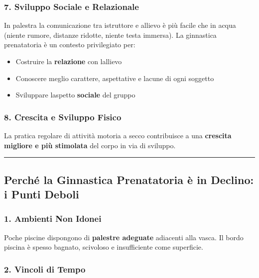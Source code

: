 \documentclass[a4paper,11pt]{article}
\providecommand{\tightlist}{%
  \setlength{\itemsep}{0pt}\setlength{\parskip}{0pt}}
\begin{document}
\subsubsection{7. Sviluppo Sociale e
      Relazionale}\label{sviluppo-sociale-e-relazionale}

In palestra la comunicazione tra istruttore e allievo è più facile che
in acqua (niente rumore, distanze ridotte, niente testa immersa). La
ginnastica prenatatoria è un contesto privilegiato per:

\begin{itemize}
      \tightlist
      \item
            Costruire la \textbf{relazione} con l\textquotesingle allievo
      \item
            Conoscere meglio carattere, aspettative e lacune di ogni soggetto
      \item
            Sviluppare l\textquotesingle aspetto \textbf{sociale} del gruppo
\end{itemize}

\subsubsection{8. Crescita e Sviluppo
      Fisico}\label{crescita-e-sviluppo-fisico}

La pratica regolare di attività motoria a secco contribuisce a una
\textbf{crescita migliore e più stimolata} del corpo in via di sviluppo.

\begin{center}\rule{0.5\linewidth}{0.5pt}\end{center}

\subsection{Perché la Ginnastica Prenatatoria è in Declino: i Punti
      Deboli}\label{perchuxe9-la-ginnastica-prenatatoria-uxe8-in-declino-i-punti-deboli}

\subsubsection{1. Ambienti Non Idonei}\label{ambienti-non-idonei}

Poche piscine dispongono di \textbf{palestre adeguate} adiacenti alla
vasca. Il bordo piscina è spesso bagnato, scivoloso e insufficiente come
superficie.

\subsubsection{2. Vincoli di Tempo}\label{vincoli-di-tempo}
\end{document}
